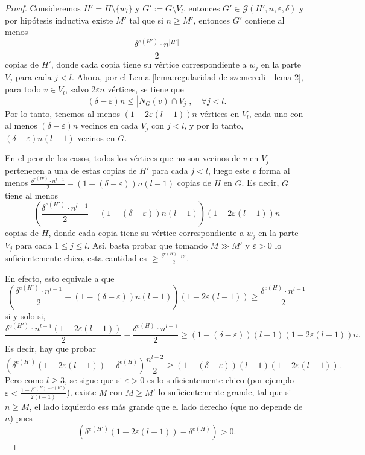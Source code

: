 \documentclass[12pt]{report}
\theoremstyle{plain}
\theoremstyle{definition}
\newcommand{\abs}[1]{\left \vert #1 \right \vert}
\begin{document}
\begin{proof}
Consideremos $H' = H \setminus \{w_l\}$ y $G' := G \setminus V_l$, entonces $G' \in \mathcal G (H' , n , \varepsilon, \delta)$ y por hipótesis inductiva existe $M'$ tal que si $n \geq M'$, entonces $G'$ contiene al menos
\[
    \frac{\delta^{e(H')} \cdot n^{\abs {H'}}}{2}
\]
copias de $H'$, donde cada copia tiene su vértice correspondiente a $w_j$ en la parte $V_j$ para cada $j < l$. Ahora, por el Lema \ref{lema:regularidad de szemeredi - lema 2}, para todo $v \in V_l$, salvo $2 \varepsilon n$ vértices, se tiene que
\[
    (\delta - \varepsilon)n \leq \abs {N_G (v) \cap V_j}, \quad \forall j < l.
\]
Por lo tanto, tenemos al menos $(1-2 \varepsilon (l-1))n$ vértices en $V_l$, cada uno con al menos $(\delta - \varepsilon)n$ vecinos en cada $V_j$ con $j <l$, y por lo tanto, $(\delta - \varepsilon)n(l-1)$ vecinos en $G$.

En el peor de los casos, todos los vértices que no son vecinos de $v$ en $V_j$ pertenecen a una de estas copias de $H'$ para cada $j < l$, luego este $v$ forma al menos $\frac{\delta^{e ( H')} \cdot n^{l-1}}{2} - (1 - (\delta - \varepsilon))n(l-1)$ copias de $H$ en $G$. Es decir, $G$ tiene al menos
\[
\left ( \frac{\delta^{e ( H')} \cdot n^{l-1}}{2} - (1 - (\delta - \varepsilon))n(l-1) \right )(1 - 2 \varepsilon(l-1))n
\]
copias de $H$, donde cada copia tiene su vértice correspondiente a $w_j$ en la parte $V_j$ para cada $1 \leq j \leq l$. Así, basta probar que tomando $M \gg M'$ y $\varepsilon > 0$ lo suficientemente chico, esta cantidad es $\geq \frac{\delta^{e(H)} \cdot n^{l}}{2}$.

En efecto, esto equivale a que
\[
    \left ( \frac{\delta^{e ( H')} \cdot n^{l-1}}{2} - (1 - (\delta - \varepsilon))n(l-1) \right )(1 - 2 \varepsilon(l-1)) \geq \frac{\delta^{e(H)} \cdot n^{l-1}}{2}
\]
si y solo si,
\[
\frac{\delta^{e(H')} \cdot n^{l-1}(1 - 2 \varepsilon (l-1))}{2} - \frac{\delta^{e(H)}\cdot n^{l-1}}{2} \geq (1- (\delta - \varepsilon))(l-1)(1-2\varepsilon (l-1))n.
\]
Es decir, hay que probar
\[
    \left ( \delta^{e(H')}(1- 2 \varepsilon (l-1)) - \delta^{e(H)} \right )\frac{n^{l-2}}{2} \geq (1- (\delta - \varepsilon))(l-1)(1-2\varepsilon (l-1)).
\]
Pero como $l \geq 3$, se sigue que si $\varepsilon>0$ es lo suficientemente chico (por ejemplo $\varepsilon < \frac{1 - \delta^{e(H)- e(H')}}{2(l-1)}$), existe $M$ con $M \geq M'$ lo suficientemente grande, tal que si $n \geq M$, el lado izquierdo ess más grande que el lado derecho (que no depende de $n$) pues
\[
    \left ( \delta^{e(H')}(1- 2 \varepsilon (l-1)) - \delta^{e(H)} \right ) > 0.
\]
\end{proof}
\end{document}
